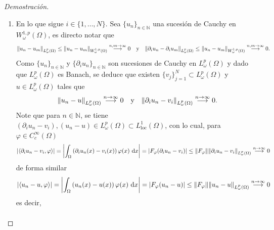 \documentclass[10pt,a4paper]{report}
\newcommand{\abs}[2][y]{\if#1y\left\fi\lvert#2\if#1y\right\fi\rvert}
\newcommand{\norm}[2][y]{{\if#1y\left\fi\lVert#2\if#1y\right\fi\rVert}}
\theoremstyle{definition}
\renewcommand{\theproblem}{\Alph{problem}}
\numberwithin{equation}{problem}
\providecommand{\abs}[1]{\left\lvert#1\right\rvert}
\providecommand{\norm}[1]{\left\lVert#1\right\rVert}
\begin{document}
\begin{proof}[\textcolor{rojo}{Demostración}]
\begin{enumerate}[label=\textbf{\theproblem.\arabic{*}.},ref=\theproblem.\arabic{*},parsep=1ex]
            concluyendo así la continuidad. Por tanto, $F_{\varphi}\in \left[L^{p}_{\omega}(\Omega)\right]'$.
            \item En lo que sigue $i\in\{1,\dots,N\}$. Sea $\{u_{n}\}_{n\in\mathbb{N}}$ una sucesión de Cauchy en $W^{1,p}_{\omega}(\Omega)$, es directo notar que 
            \begin{align*}
            	\norm{u_{n}-u_{m}}_{L^{p}_{\omega}(\Omega)}\leq \norm{u_{n}-u_{m}}_{W^{1,p}_{\omega}(\Omega)} \overset{n,m\to\infty}{\longrightarrow}0 \quad \text{y}\quad \norm{\partial_{i}u_{n}-\partial_{i}u_{m}}_{L^{p}_{\omega}(\Omega)}\leq \norm{u_{n}-u_{m}}_{W^{1,p}_{\omega}(\Omega)} \overset{n,m\to\infty}{\longrightarrow}0.
            \end{align*}
            Como $\{u_{n}\}_{n\in\mathbb{N}}$ y $\{\partial_{i}u_{n}\}_{n\in\mathbb{N}}$ son sucesiones de Cauchy en $L^{p}_{\omega}(\Omega)$ y dado que $L^{p}_{\omega}(\Omega)$ es Banach, se deduce que existen $\{v_{j}\}_{j=1}^{N}\subset L^{p}_{\omega}(\Omega)$ y $u\in L^{p}_{\omega}(\Omega)$ tales que 
            \begin{align*}
            	\norm{u_{n}-u}_{L_{\omega}^{p}(\Omega)} \overset{n\to\infty}{\longrightarrow}0 \quad \text{y} \quad 	\norm{\partial_{i}u_{n}-v_{i}}_{L_{\omega}^{p}(\Omega)} \overset{n\to\infty}{\longrightarrow}0.
            \end{align*} 
            Note que para $n\in\mathbb{N}$, se tiene $\left(\partial_{i}u_{n}-v_{i}\right),\left(u_{n}-u\right)\in L^{p}_{\omega}(\Omega)\subset L_{\text{loc}}^{1}(\Omega)$, con lo cual, para $\varphi\in C_{c}^{\infty}(\Omega)$ 
            \begin{align*}
            	\abs{\langle \partial_{i}u_{n} - v_{i},\varphi \rangle} = \abs{\int_{\Omega} \left(\partial_{i}u_{n}(x) - v_{i}(x)\right)\varphi(x)\ \text{d}x} = \abs{F_{\varphi}(\partial_{i}u_{n}-v_{i})}\leq\norm{F_{\varphi}}\norm{\partial_{i}u_{n}-v_{i}}_{L^{p}_{\omega}(\Omega)}\overset{n\to \infty}{\longrightarrow} 0
            \end{align*}
            de forma similar
            \begin{align*}
            	\abs{\langle u_{n} - u,\varphi \rangle} = \abs{\int_{\Omega} \left(u_{n}(x) - u(x)\right)\varphi(x)\ \text{d}x} = \abs{F_{\varphi}(u_{n}-u)}\leq\norm{F_{\varphi}}\norm{u_{n}-u}_{L^{p}_{\omega}(\Omega)}\overset{n\to \infty}{\longrightarrow} 0
            \end{align*}
            es decir,
            \begin{align*}

\end{align*}
\end{enumerate}
\end{proof}
\end{document}
